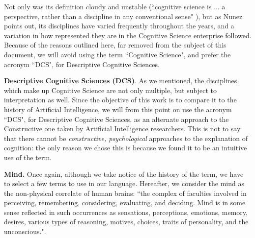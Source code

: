 \documentclass[../main.tex]{subfiles}
\begin{document}
Not only was its definition cloudy and unstable (``cognitive science is ... a perspective, rather than a discipline in any conventional sense" \cite{sheehyCognitiveScience1995}), but as Nunez points out, its disciplines have varied frequently throughout the years, and a variation in how represented they are in the Cognitive Science enterprise followed. Because of the reasons outlined here, far removed from the subject of this document, we will avoid using the term ``Cognitive Science", and prefer the acronym ``DCS", for Descriptive Cognitive Sciences.

\vspace{5pt}
\textbf{Descriptive Cognitive Sciences (DCS)}. As we mentioned, the disciplines which make up Cognitive Science are not only multiple, but subject to interpretation as well. Since the objective of this work is to compare it to the history of Artificial Intelligence, we will from this point on use the acronym ``DCS", for Descriptive Cognitive Sciences, as an alternate approach to the Constructive one taken by Artificial Intelligence researchers. This is not to say that there cannot be \textit{constructive, psychological} approaches to the explanation of cognition: the only reason we chose this is because we found it to be an intuitive use of the term.

\vspace{5pt}
\textbf{Mind.} Once again, although we take notice of the history of the term, we have to select a few terms to use in our language. Hereafter, we consider the mind as the non-physical correlate of human brains: ``the complex of faculties involved in perceiving, remembering, considering, evaluating, and deciding. Mind is in some sense reflected in such occurrences as sensations, perceptions, emotions, memory, desires, various types of reasoning, motives, choices, traits of personality, and the unconscious."\cite{Mind}.
\end{document}
